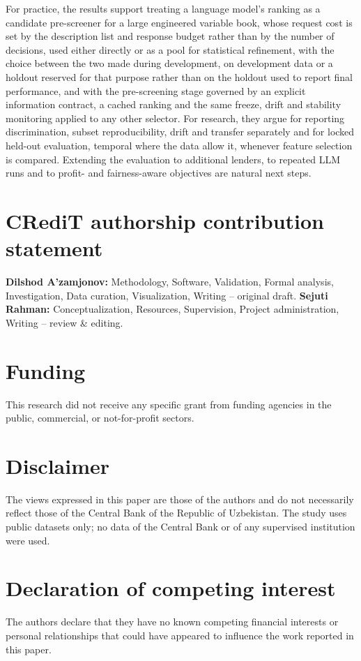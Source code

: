 \documentclass[final,5p,twocolumn]{elsarticle}
\begin{document}
For practice, the results support treating a language model's ranking as a candidate pre-screener for a large engineered variable book, whose request cost is set by the description list and response budget rather than by the number of decisions, used either directly or as a pool for statistical refinement, with the choice between the two made during development, on development data or a holdout reserved for that purpose rather than on the holdout used to report final performance, and with the pre-screening stage governed by an explicit information contract, a cached ranking and the same freeze, drift and stability monitoring applied to any other selector. For research, they argue for reporting discrimination, subset reproducibility, drift and transfer separately and for locked held-out evaluation, temporal where the data allow it, whenever feature selection is compared. Extending the evaluation to additional lenders, to repeated LLM runs and to profit- and fairness-aware objectives are natural next steps.


\section*{CRediT authorship contribution statement}
\textbf{Dilshod A'zamjonov:} Methodology, Software, Validation, Formal analysis, Investigation, Data curation, Visualization, Writing -- original draft. \textbf{Sejuti Rahman:} Conceptualization, Resources, Supervision, Project administration, Writing -- review \& editing.

\section*{Funding}
This research did not receive any specific grant from funding agencies in the public, commercial, or not-for-profit sectors.

\section*{Disclaimer}
The views expressed in this paper are those of the authors and do not necessarily reflect those of the Central Bank of the Republic of Uzbekistan. The study uses public datasets only; no data of the Central Bank or of any supervised institution were used.

\section*{Declaration of competing interest}
The authors declare that they have no known competing financial interests or personal relationships that could have appeared to influence the work reported in this paper.
\end{document}
